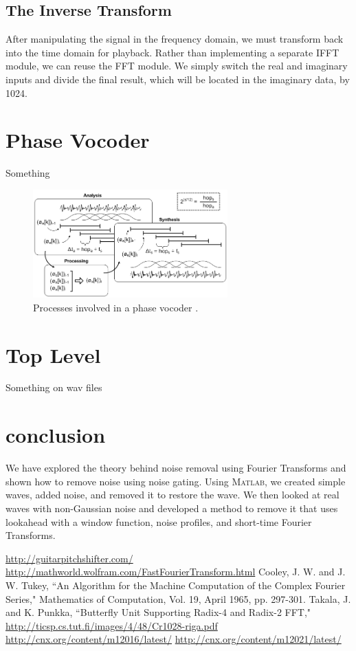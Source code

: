 \documentclass[twoside]{article}
\begin{document}
  
  
  \subsection{The Inverse Transform}
    After manipulating the signal in the frequency domain, we must transform back into the time domain for playback. 
    Rather than implementing a separate IFFT module, we can reuse the FFT module.  We simply switch the real and imaginary
    inputs and divide the final result, which will be located in the imaginary data, by 1024.

%
%
%
%
\section{Phase Vocoder}
  Something
  \begin{figure}[h]
  \includegraphics[width=75mm]{images/vocoder.png}
  \caption{Processes involved in a phase vocoder \cite{bib:guitarpitchshifter}.}  
  \label{fig:vocoder}
  \end{figure}

%
%
%
%
\section{Top Level}
  Something on wav files


%
\section{conclusion}
We have explored the theory behind noise removal using Fourier Transforms and shown how to remove noise using noise gating.  Using 
\textsc{Matlab}, we created simple waves, added noise, and removed it to restore the wave.  We then 
looked at real waves with non-Gaussian noise and developed a method to remove it that uses lookahead with a window function, noise 
profiles, and short-time Fourier Transforms. 



\begin{thebibliography}{10}
 \url{http://guitarpitchshifter.com/}
 \url{http://mathworld.wolfram.com/FastFourierTransform.html}
 	Cooley, J. W. and J. W. Tukey, ``An Algorithm for the Machine Computation of the Complex Fourier Series," Mathematics of Computation, Vol. 19, April 1965, pp. 297-301.
 Takala, J. and K. Punkka, ``Butterfly Unit Supporting Radix-4 and Radix-2 FFT," \url{http://ticsp.cs.tut.fi/images/4/48/Cr1028-riga.pdf}
 \url{http://cnx.org/content/m12016/latest/}
 \url{http://cnx.org/content/m12021/latest/}
\end{thebibliography}
\end{document}
